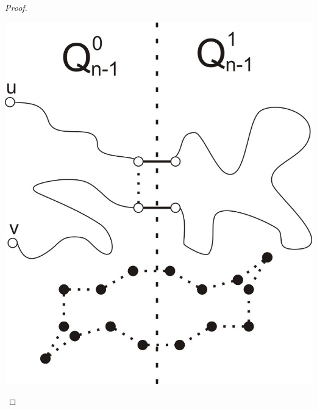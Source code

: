\documentclass{pracamgr}
\begin{document}
\begin{proof}
\begin{center}
      \includegraphics[scale=0.75]{img/Q_hamilton_c2.jpg}
     \end{center}
    \end{proof}
\end{document}

